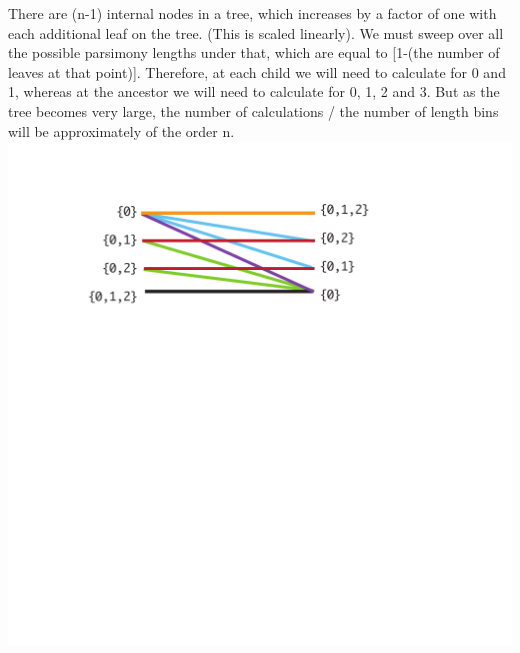 \documentclass[a0paper,landscape]{baposter}
\begin{document}
\begin{poster}
{There are (n-1) internal nodes in a tree, which increases by a factor of one with each additional leaf on the tree.  (This is scaled linearly).  We must sweep over all the possible parsimony lengths under that, which are equal to [1-(the number of leaves at that point)].  Therefore, at each child we will need to calculate for 0 and 1, whereas at the ancestor we will need to calculate for 0, 1, 2 and 3.  But as the tree becomes very large, the number of calculations / the number of length bins will be approximately of the order n.\\
\includegraphics[width=44em]{downpass-symmetry}
}


\end{poster}
\end{document}

